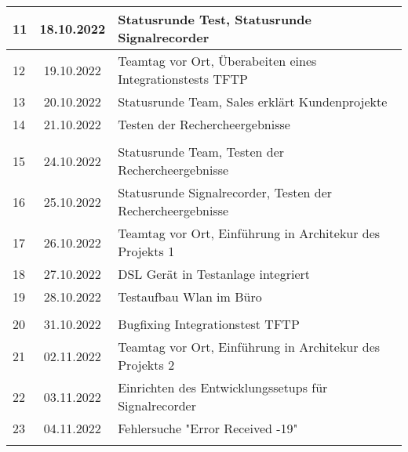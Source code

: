 \begin{longtable}{|l|c|l|}
11  & 18.10.2022    & Statusrunde Test, Statusrunde Signalrecorder                                                      \\ \hline   
12  & 19.10.2022    & Teamtag vor Ort, Überabeiten eines Integrationstests TFTP                                                      \\ \hline   
13  & 20.10.2022    & Statusrunde Team, Sales erklärt Kundenprojekte                                                      \\ \hline   
14  & 21.10.2022    & Testen der Rechercheergebnisse                                                      \\ \hline  
    &               &                                                       \\ \hline 
15  & 24.10.2022    & Statusrunde Team, Testen der Rechercheergebnisse                                                   \\ \hline   
16  & 25.10.2022    & Statusrunde Signalrecorder, Testen der Rechercheergebnisse                                                      \\ \hline   
17  & 26.10.2022    & Teamtag vor Ort, Einführung in Architekur des Projekts 1                                                      \\ \hline   
18  & 27.10.2022    & DSL Gerät in Testanlage integriert                                                      \\ \hline   
19  & 28.10.2022    & Testaufbau Wlan im Büro                                                      \\ \hline 
    &               &                                                       \\ \hline
20  & 31.10.2022    & Bugfixing Integrationstest TFTP                                                      \\ \hline   
21  & 02.11.2022    & Teamtag vor Ort, Einführung in Architekur des Projekts 2                                                        \\ \hline   
22  & 03.11.2022    & Einrichten des Entwicklungssetups für Signalrecorder                                                      \\ \hline   
23  & 04.11.2022    & Fehlersuche "Error Received -19"                                                      \\ \hline 
&               &                                                       \\ \hline 

\end{longtable}
